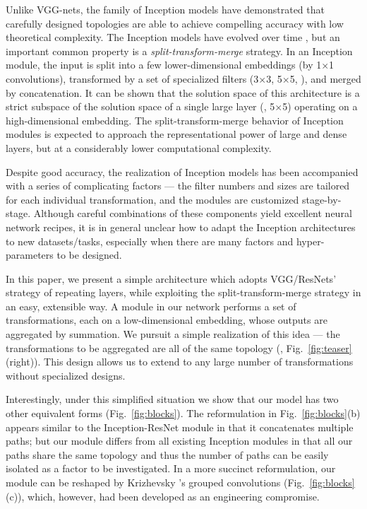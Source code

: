 \documentclass[10pt,twocolumn,letterpaper]{article}
\begin{document}
Unlike VGG-nets, the family of Inception models \cite{Szegedy2015,Ioffe2015,Szegedy2016a,Szegedy2016} have demonstrated that carefully designed topologies are able to achieve compelling accuracy with low theoretical complexity.
The Inception models have evolved over time \cite{Szegedy2015,Szegedy2016a}, but an important common property is a \emph{split-transform-merge} strategy. In an Inception module, the input is split into a few lower-dimensional embeddings (by 1$\times$1 convolutions), transformed by a set of specialized filters (3$\times$3, 5$\times$5, \etc), and merged by concatenation. 
It can be shown that the solution space of this architecture is a strict subspace of the solution space of a single large layer (\eg, 5$\times$5) operating on a high-dimensional embedding. The split-transform-merge behavior of Inception modules is expected to approach the representational power of large and dense layers, but at a considerably lower computational complexity.

Despite good accuracy, the realization of Inception models has been accompanied with a series of complicating factors --- the filter numbers and sizes are tailored for each individual transformation, and the modules are customized stage-by-stage. Although careful combinations of these components yield excellent neural network recipes, it is in general unclear how to adapt the Inception architectures to new datasets/tasks, especially when there are many factors and hyper-parameters to be designed.

In this paper, we present a simple architecture which adopts VGG/ResNets' strategy of repeating layers, while exploiting the split-transform-merge strategy in an easy, extensible way.
A module in our network performs a set of transformations, each on a low-dimensional embedding, whose outputs are aggregated by summation.
We pursuit a simple realization of this idea --- the transformations to be aggregated are all of the same topology (\eg, Fig.~\ref{fig:teaser} (right)). This design allows us to extend to any large number of transformations without specialized designs.

Interestingly, under this simplified situation we show that our model has two other equivalent forms (Fig.~\ref{fig:blocks}). The reformulation in Fig.~\ref{fig:blocks}(b) appears similar to the Inception-ResNet module \cite{Szegedy2016} in that it concatenates multiple paths; but our module differs from all existing Inception modules in that all our paths share the same topology and thus the number of paths can be easily isolated as a factor to be investigated. In a more succinct reformulation, our module can be reshaped by Krizhevsky \etal's grouped convolutions \cite{Krizhevsky2012} (Fig.~\ref{fig:blocks}(c)), which, however, had been developed as an engineering compromise.
\end{document}
